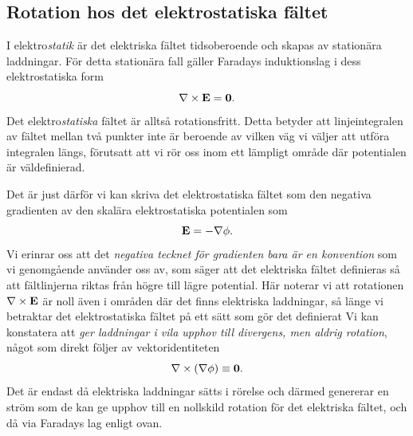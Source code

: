 \subsection{Rotation hos det elektrostatiska f{\"a}ltet}
I elektro{\it statik} {\"a}r det elektriska f{\"a}ltet tidsoberoende och skapas
av station{\"a}ra laddningar. F{\"o}r detta station{\"a}ra fall g{\"a}ller
Faradays induktionslag i dess elektrostatiska form
$$
  \nabla\times{\bf E}={\bf 0}.
$$
Det elektro{\it statiska}
f{\"a}ltet {\"a}r allts{\aa} rotationsfritt. Detta betyder att linjeintegralen
av f{\"a}ltet mellan tv{\aa} punkter inte {\"a}r beroende av vilken v{\"a}g vi
v{\"a}ljer att utf{\"o}ra integralen l{\"a}ngs, f{\"o}rutsatt att vi r{\"o}r
oss inom ett l{\"a}mpligt omr{\aa}de d{\"a}r potentialen {\"a}r
v{\"a}ldefinierad.

Det {\"a}r just d{\"a}rf{\"o}r vi kan skriva det elektrostatiska f{\"a}ltet
som den negativa gradienten av den skal{\"a}ra elektrostatiska potentialen som
$$
  {\bf E}=-\nabla\phi.
$$
Vi erinrar oss att det {\it negativa tecknet f{\"o}r gradienten bara {\"a}r en
konvention} som vi genomg{\aa}ende anv{\"a}nder oss av, som s{\"a}ger att det
elektriska f{\"a}ltet definieras s{\aa} att f{\"a}ltlinjerna riktas fr{\aa}n
h{\"o}gre till l{\"a}gre potential.
H{\"a}r noterar vi att rotationen $\nabla\times{\bf E}$ {\"a}r noll {\"a}ven
i omr{\aa}den d{\"a}r det finns elektriska laddningar, s{\aa} l{\"a}nge vi
betraktar det elektrostatiska f{\"a}ltet p{\aa} ett s{\"a}tt som g{\"o}r det
definierat
Vi kan konstatera att {\it ger laddningar i vila upphov till divergens, men
aldrig rotation}, n{\aa}got som direkt f{\"o}ljer av vektoridentiteten
$$
  \nabla\times(\nabla\phi)\equiv{\bf 0}.
$$
Det {\"a}r endast d{\aa} elektriska laddningar s{\"a}tts i r{\"o}relse och
d{\"a}rmed genererar en str{\"o}m som de kan ge upphov till en nollskild
rotation f{\"o}r det elektriska f{\"a}ltet, och d{\aa} via Faradays lag
enligt ovan.

